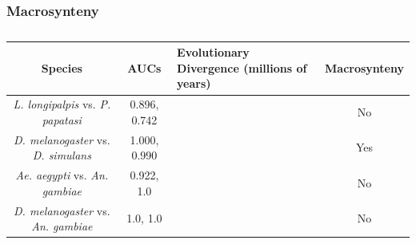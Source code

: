 \subsubsection{Macrosynteny}

\begin{table}[H]
  \centering
  \begin{tabular}{|c|c|p{2.8cm}|c|} \hline
  Species & AUCs & Evolutionary Divergence (millions of years) & Macrosynteny \\ \hline
  \emph{L. longipalpis} vs. \emph{P. papatasi} & 0.896, 0.742 & & No \\ \hline
  \emph{D. melanogaster} vs. \emph{D. simulans} & 1.000, 0.990 & & Yes \\ \hline
  \emph{Ae. aegypti} vs. \emph{An. gambiae} & 0.922, 1.0 & & No \\ \hline
  \emph{D. melanogaster} vs. \emph{An. gambiae} & 1.0, 1.0 & & No \\ \hline
  \end{tabular}
  \caption{}
  \label{tab:synteny-species}
\end{table}

